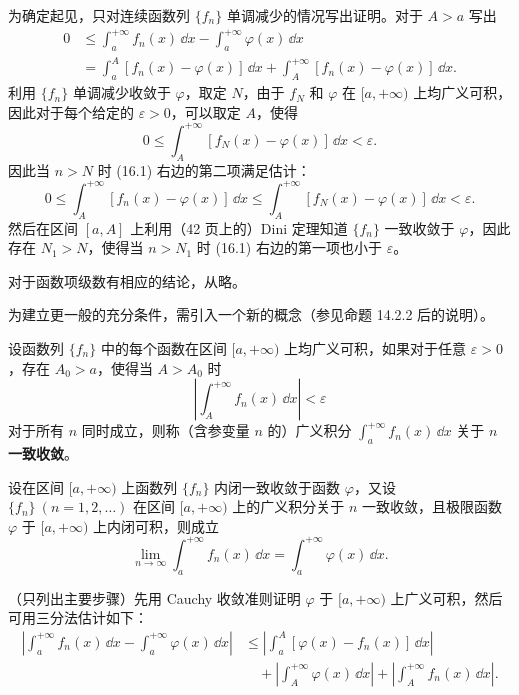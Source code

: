 \begin{xproof}
为确定起见，只对连续函数列 $\{f_n\}$ 单调减少的情况写出证明。对于 $A>a$ 写出
\begin{equation}
\begin{aligned}
0&\leqslant \int_a^{+\infty}f_n(x)\,\dd x-\int_a^{+\infty}\varphi(x)\,\dd x\\
 &=\int_a^A[f_n(x)-\varphi(x)]\,\dd x+\int_A^{+\infty}[f_n(x)-\varphi(x)]\,\dd x.
\end{aligned}
\tag{16.1}
\label{eq:16.1}
\end{equation}
利用 $\{f_n\}$ 单调减少收敛于 $\varphi$，取定 $N$，由于 $f_N$ 和 $\varphi$ 在 $[a,+\infty)$ 上均广义可积，因此对于每个给定的 $\varepsilon>0$，可以取定 $A$，使得
\[
  0\leqslant\int_A^{+\infty}[f_N(x)-\varphi(x)]\,\dd x<\varepsilon.
\]
因此当 $n>N$ 时 (16.1) 右边的第二项满足估计：
\[
  0\leqslant\int_A^{+\infty}[f_n(x)-\varphi(x)]\,\dd x
  \leqslant\int_A^{+\infty}[f_N(x)-\varphi(x)]\,\dd x<\varepsilon.
\]
然后在区间 $[a,A]$ 上利用（42 页上的）Dini 定理知道 $\{f_n\}$ 一致收敛于 $\varphi$，因此存在 $N_1>N$，使得当 $n>N_1$ 时 (16.1) 右边的第一项也小于 $\varepsilon$。
\end{xproof}

\begin{xremark}
对于函数项级数有相应的结论，从略。
\end{xremark}

为建立更一般的充分条件，需引入一个新的概念（参见命题 14.2.2 后的说明）。

\begin{xdefinition}
设函数列 $\{f_n\}$ 中的每个函数在区间 $[a,+\infty)$ 上均广义可积，如果对于任意 $\varepsilon>0$，存在 $A_0>a$，使得当 $A>A_0$ 时
\[
  \left|\int_A^{+\infty}f_n(x)\,\dd x\right|<\varepsilon
\]
对于所有 $n$ 同时成立，则称（含参变量 $n$ 的）广义积分 $\int_a^{+\infty}f_n(x)\,\dd x$ 关于 $n$ \textbf{一致收敛}。
\end{xdefinition}

\begin{xproposition}[16.1.2]
设在区间 $[a,+\infty)$ 上函数列 $\{f_n\}$ 内闭一致收敛于函数 $\varphi$，又设 $\{f_n\}\ (n=1,2,\ldots)$ 在区间 $[a,+\infty)$ 上的广义积分关于 $n$ 一致收敛，且极限函数 $\varphi$ 于 $[a,+\infty)$ 上内闭可积，则成立
\[
  \lim_{n\to\infty}\int_a^{+\infty}f_n(x)\,\dd x
  =\int_a^{+\infty}\varphi(x)\,\dd x.
\]
\end{xproposition}

\begin{xproof}
（只列出主要步骤）先用 Cauchy 收敛准则证明 $\varphi$ 于 $[a,+\infty)$ 上广义可积，然后可用三分法估计如下：
\[
\begin{aligned}
\left|\int_a^{+\infty}f_n(x)\,\dd x-\int_a^{+\infty}\varphi(x)\,\dd x\right|
&\leqslant\left|\int_a^A[\varphi(x)-f_n(x)]\,\dd x\right|\\
&\quad+\left|\int_A^{+\infty}\varphi(x)\,\dd x\right|
+\left|\int_A^{+\infty}f_n(x)\,\dd x\right|.
\end{aligned}
\]
\end{xproof}

